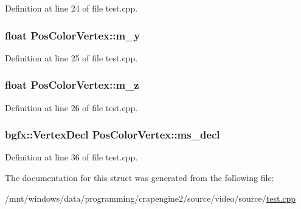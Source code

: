 Definition at line 24 of file test.\+cpp.

\hypertarget{struct_pos_color_vertex_ad7267f34b67c4df4d93f36cfa155ad30}{
\subsubsection[{m\+\_\+y}]{\setlength{\rightskip}{0pt plus 5cm}float Pos\+Color\+Vertex\+::m\+\_\+y}}\label{struct_pos_color_vertex_ad7267f34b67c4df4d93f36cfa155ad30}


Definition at line 25 of file test.\+cpp.

\hypertarget{struct_pos_color_vertex_ad1c60f507ba3000e2462ac991239bfa9}{
\subsubsection[{m\+\_\+z}]{\setlength{\rightskip}{0pt plus 5cm}float Pos\+Color\+Vertex\+::m\+\_\+z}}\label{struct_pos_color_vertex_ad1c60f507ba3000e2462ac991239bfa9}


Definition at line 26 of file test.\+cpp.

\hypertarget{struct_pos_color_vertex_aa549173ded56d04849504690c104a28e}{
\subsubsection[{ms\+\_\+decl}]{\setlength{\rightskip}{0pt plus 5cm}bgfx\+::\+Vertex\+Decl Pos\+Color\+Vertex\+::ms\+\_\+decl\hspace{0.3cm}{\ttfamily [static]}}}\label{struct_pos_color_vertex_aa549173ded56d04849504690c104a28e}


Definition at line 36 of file test.\+cpp.



The documentation for this struct was generated from the following file\+:\begin{DoxyCompactItemize}
\item 
/mnt/windows/data/programming/crapengine2/source/video/source/\hyperlink{video_2source_2test_8cpp}{test.\+cpp}\end{DoxyCompactItemize}
